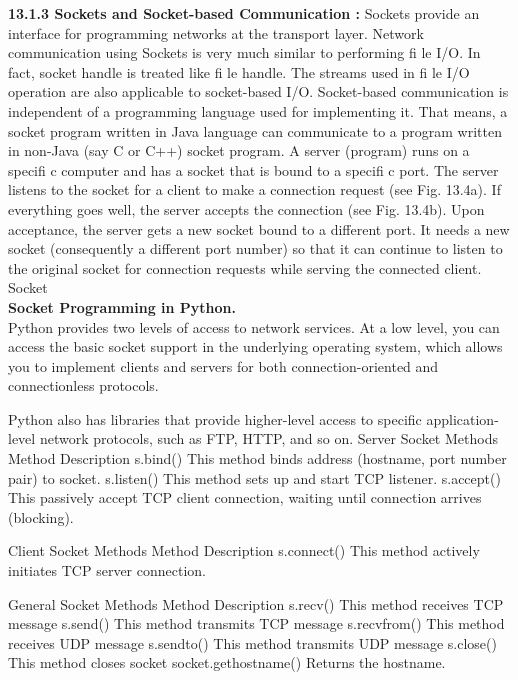 \documentclass{article}
\begin{document}
\textbf{\large13.1.3 Sockets and Socket-based Communication :}
Sockets provide an interface for programming networks at the transport layer. Network communication
using Sockets is very much similar to performing fi le I/O. In fact, socket handle is treated like fi le handle.
The streams used in fi le I/O operation are also applicable to socket-based I/O. Socket-based
communication is independent of a programming language used for implementing it. That means, a socket
program written in Java language can communicate to a program written in non-Java (say C or C++) socket
program.
A server (program) runs on a specifi c computer and has a socket that is bound to a specifi c port. The
server listens to the socket for a client to make a connection request (see Fig. 13.4a). If everything goes
well, the server accepts the connection (see Fig. 13.4b). Upon acceptance, the server gets a new socket
bound to a different port. It needs a new socket (consequently a different port number) so that it can
continue to listen to the original socket for connection requests while serving the connected client.
 Socket\\[.5cm] 
\textbf{\large Socket Programming in Python. }\\[.5cm]
Python provides two levels of access to network services. At a low level, you can access the basic socket support in the underlying operating system, which allows you to implement clients and servers for both connection-oriented and connectionless protocols.

Python also has libraries that provide higher-level access to specific application-level network protocols, such as FTP, HTTP, and so on.
Server Socket Methods
Method	Description
s.bind()	This method binds address (hostname, port number pair) to socket.
s.listen()	This method sets up and start TCP listener.
s.accept()	This passively accept TCP client connection, waiting until connection arrives (blocking).

Client Socket Methods
Method	Description
s.connect()	This method actively initiates TCP server connection.

General Socket Methods
Method	Description
s.recv()	This method receives TCP message
s.send()	This method transmits TCP message
s.recvfrom()	This method receives UDP message
s.sendto()	This method transmits UDP message
s.close()	This method closes socket
socket.gethostname()	Returns the hostname.
\end{document}
